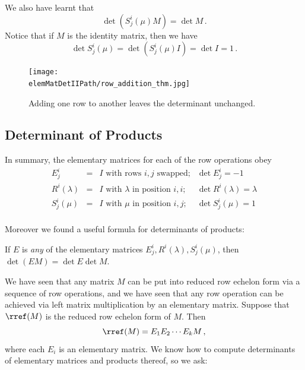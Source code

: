 
\noindent
We also have learnt that
\[\det \left( S^i_j(\mu)M \right) = \det M\, .\]
Notice that if $M$ is the identity matrix, then we have \[\det S^i_j(\mu) = \det (S^i_j(\mu)I) = \det I = 1\, .\]



\begin{figure}
\begin{center}
\texttt{[image: \\elemMatDetIIPath/row\_addition\_thm.jpg]}
\end{center}
\caption{Adding one row to another leaves the determinant unchanged.}
\end{figure}

\subsection{Determinant of Products}
In summary, the elementary matrices for each of the row operations obey
\[
\begin{array}{cccc}
E^i_j &=& I \text{ with rows $i,j$ swapped;} &\det E^i_j=-1 \\[3mm]
R^i(\lambda) &=& I \text{ with $\lambda$ in position $i,i$;} 
	&\det R^i(\lambda)=\lambda \\[3mm]
S^i_j(\mu) &=& I \text{ with $\mu$ in position $i,j$;} 
	&\det S^i_j(\mu)=1 \\[3mm]
\end{array}
\]

Moreover  we found a useful formula for determinants of products:

\begin{theorem}
If $E$ is \emph{ any} of the elementary matrices $E^i_j, R^i(\lambda), S^i_j(\mu)$, then $\det(EM)=\det E \det M$.
\end{theorem}




We have seen that any matrix $M$ can be put into reduced row echelon form via a sequence of row operations, and we have seen that any row operation can be achieved via left matrix multiplication by an elementary matrix.  Suppose that $\rref(M)$ is the reduced row echelon form of $M$.  Then \[\rref(M)=E_1E_2\cdots E_kM\, ,\] where each $E_i$ is an elementary matrix.
We know how to compute determinants of elementary matrices and products thereof, so we ask:

